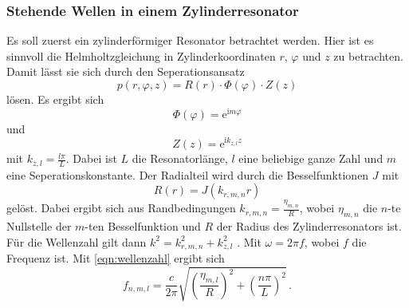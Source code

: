 \subsubsection{Stehende Wellen in einem Zylinderresonator}
Es soll zuerst ein zylinderförmiger Resonator betrachtet werden.
Hier ist es sinnvoll die Helmholtzgleichung in Zylinderkoordinaten $r$, $\varphi$ und $z$ zu betrachten. 
Damit lässt sie sich durch den Seperationsansatz
\begin{equation*}
    p\left(r,\varphi,z\right)=R\left(r\right)\cdot \Phi\left(\varphi\right) \cdot Z\left(z\right)
\end{equation*}
lösen.
Es ergibt sich
\begin{equation*}
    \Phi\left(\varphi\right)=\mathrm{e}^{\mathrm{i} m \varphi}
\end{equation*}
und
\begin{equation*}
    Z\left(z\right)=\mathrm{e}^{\mathrm{i} k_{z,l} z}
\end{equation*}
mit $k_{z,l}=\frac{l \pi}{L}$.
Dabei ist $L$ die Resonatorlänge, $l$ eine beliebige ganze Zahl und $m$ eine Seperationskonstante.
Der Radialteil wird durch die Besselfunktionen $J$ mit
\begin{equation*}
    R\left(r\right) = J \left(k_{r,m,n} r\right)
\end{equation*}
gelöst.
Dabei ergibt sich aus Randbedingungen $k_{r,m,n}=\frac{\eta_{m,n}}{R}$, wobei $\eta_{m,n}$ die $n$-te Nullstelle der $m$-ten Besselfunktion und $R$ der Radius des Zylinderresonators ist. %
Für die Wellenzahl gilt dann $k^2 = k_{r,m,n}^2 + k_{z,l}^2$ \cite[107 f.]{ehlotzky_2007}. %
Mit $\omega = 2 \pi f$, wobei $f$ die Frequenz ist.
Mit \autoref{eqn:wellenzahl} ergibt sich
\begin{equation}
    f_{n,m,l} = \frac{c}{2 \pi} \sqrt{\left(\frac{\eta_{m,l}}{R}\right)^2 + \left( \frac{n \pi}{L}\right)^2} \, .
    \label{eqn:zylfreq}
\end{equation}
